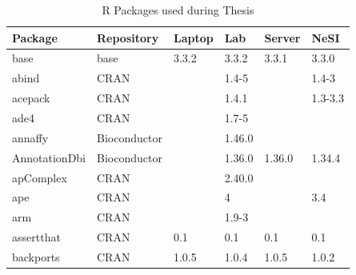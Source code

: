\begin{longtable}{llllll}
\caption{R Packages used during Thesis}
\label{tab:computers_r_packages_full}
\\
\multicolumn{1}{l}{\bfseries Package}  & \multicolumn{1}{l}{\bfseries Repository}  & \multicolumn{1}{l}{\bfseries Laptop}      & \multicolumn{1}{l}{\bfseries Lab}         & \multicolumn{1}{l}{\bfseries Server}         & \multicolumn{1}{l}{\bfseries NeSI} \\ \hline \rowcolor{black!10}
base                          & base                      & 3.3.2       & 3.3.2       & 3.3.1          & 3.3.0             \\
\rowcolor{black!5}
abind                         & CRAN                      &             & 1.4-5       &                & 1.4-3              \\
\rowcolor{black!10}
acepack                       & CRAN                      &             & 1.4.1       &                & 1.3-3.3           \\
\rowcolor{black!5}
ade4                          & CRAN                      &             & 1.7-5       &                &                    \\
\rowcolor{black!10}
annaffy                       & Bioconductor              &             & 1.46.0      &                &                   \\
\rowcolor{black!5}
AnnotationDbi                 & Bioconductor              &             & 1.36.0      & 1.36.0         & 1.34.4             \\
\rowcolor{black!10}
apComplex                     & CRAN                      &             & 2.40.0      &                &                   \\
\rowcolor{black!5}
ape                           & CRAN                      &             & 4           &                & 3.4                \\
\rowcolor{black!10}
arm                           & CRAN                      &             & 1.9-3       &                &                   \\
\rowcolor{black!5}
assertthat                    & CRAN                      & 0.1         & 0.1         & 0.1            & 0.1                \\
\rowcolor{black!10}
backports                     & CRAN                      & 1.0.5       & 1.0.4       & 1.0.5          & 1.0.2             \\

\end{longtable}
